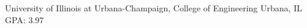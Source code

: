 
        {University of Illinois at Urbana-Champaign, College of Engineering}
        {Urbana, IL}
        {GPA: 3.97}
        {}
